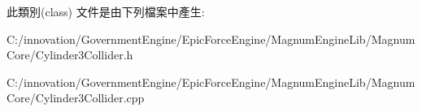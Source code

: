 此類別(class) 文件是由下列檔案中產生\+:\begin{DoxyCompactItemize}
\item 
C\+:/innovation/\+Government\+Engine/\+Epic\+Force\+Engine/\+Magnum\+Engine\+Lib/\+Magnum\+Core/Cylinder3\+Collider.\+h\item 
C\+:/innovation/\+Government\+Engine/\+Epic\+Force\+Engine/\+Magnum\+Engine\+Lib/\+Magnum\+Core/Cylinder3\+Collider.\+cpp\end{DoxyCompactItemize}
